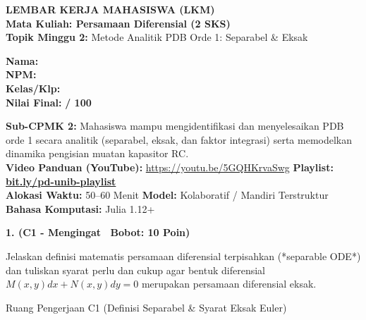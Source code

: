 \documentclass[10pt,a4paper]{article}
\begin{document}
\noindent\begin{minipage}[c]{0.68\textwidth}%
  {\large\textbf{\color{unibblue}LEMBAR KERJA MAHASISWA (LKM)}}\\[1mm]
  {\normalsize\textbf{Mata Kuliah: Persamaan Diferensial (2 SKS)}}\\[0.5mm]
  {\small\textbf{Topik Minggu 2:} Metode Analitik PDB Orde 1: Separabel \& Eksak}%
\end{minipage}%
\hfill%
\begin{minipage}[c]{0.30\textwidth}%
  \begin{tcolorbox}[colback=unibblue!5,colframe=unibblue,boxrule=0.6pt,arc=2pt,left=4pt,right=4pt,top=2pt,bottom=2pt]
    \scriptsize
    \textbf{Nama:} \dotfill\\[1.2mm]
    \textbf{NPM:} \dotfill\\[1.2mm]
    \textbf{Kelas/Klp:} \dotfill\\[1.2mm]
    \textbf{Nilai Final:} \hfill \textbf{/ 100}
  \end{tcolorbox}%
\end{minipage}\par

\vspace{1.5mm}

\begin{tcolorbox}[colback=boxbg,colframe=unibgold!90!black,boxrule=0.6pt,arc=2pt,left=5pt,right=5pt,top=3pt,bottom=3pt,title=\textbf{\scriptsize Capaian Pembelajaran (Sub-CPMK 2) \& Pedoman Evaluasi OBE}]
  \scriptsize
  \textbf{Sub-CPMK 2:} Mahasiswa mampu mengidentifikasi dan menyelesaikan PDB orde 1 secara analitik (separabel, eksak, dan faktor integrasi) serta memodelkan dinamika pengisian muatan kapasitor RC.\\
  \textbf{Video Panduan (YouTube):} \url{https://youtu.be/5GQHKrvaSwg} \hfill \textbf{Playlist:} \href{https://www.youtube.com/playlist?list=PLS5oOZWXZeTw}{\color{unibblue}\textbf{bit.ly/pd-unib-playlist}}\\\textbf{Alokasi Waktu:} 50--60 Menit \quad\textbar\quad \textbf{Model:} Kolaboratif / Mandiri Terstruktur \quad\textbar\quad \textbf{Bahasa Komputasi:} Julia 1.12+
\end{tcolorbox}

\vspace{1mm}

\noindent\textbf{1. (C1 - Mengingat \textbar\ Bobot: 10 Poin)}\par\vspace{0.5mm}
{\footnotesize Jelaskan definisi matematis persamaan diferensial terpisahkan (*separable ODE*) dan tuliskan syarat perlu dan cukup agar bentuk diferensial $M(x,y)dx + N(x,y)dy = 0$ merupakan persamaan diferensial eksak.}
\begin{answerbox}{Ruang Pengerjaan C1 (Definisi Separabel \& Syarat Eksak Euler)}
  \vspace{2.0cm}
\end{answerbox}
\end{document}
